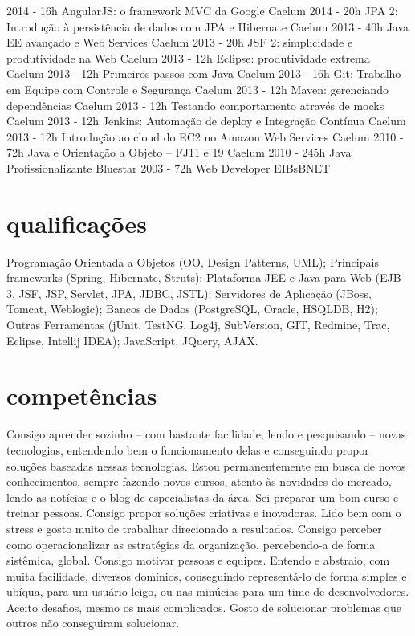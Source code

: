 \begin{entrylistii}
  \entryii
    {2014 - 16h}
    {AngularJS: o framework MVC da Google}
    {Caelum}
  \entryii
    {2014 - 20h}
    {JPA 2: Introdução à persistência de dados com JPA e Hibernate}
    {Caelum}
  \entryii
    {2013 - 40h}
    {Java EE avançado e Web Services}
    {Caelum}
  \entryii
    {2013 - 20h}
    {JSF 2: simplicidade e produtividade na Web}
    {Caelum}
  \entryii
    {2013 - 12h}
    {Eclipse: produtividade extrema}
    {Caelum}
  \entryii
    {2013 - 12h}
    {Primeiros passos com Java}
    {Caelum}
  \entryii
    {2013 - 16h}
    {Git: Trabalho em Equipe com Controle e Segurança}
    {Caelum}
  \entryii
    {2013 - 12h}
    {Maven: gerenciando dependências}
    {Caelum}
  \entryii
    {2013 - 12h}
    {Testando comportamento através de mocks}
    {Caelum}
  \entryii
    {2013 - 12h}
    {Jenkins: Automação de deploy e Integração Contínua}
    {Caelum}
  \entryii
    {2013 - 12h}
    {Introdução ao cloud do EC2 no Amazon Web Services}
    {Caelum}
  \entryii
    {2010 - 72h}
    {Java e Orientação a Objeto – FJ11 e 19}
    {Caelum}
  \entryii
    {2010 - 245h}
    {Java Profissionalizante}
    {Bluestar}
  \entryii
    {2003 - 72h}
    {Web Developer}
    {EIBsBNET}
\end{entrylistii}

\newpage

\section{qualificações}

Programação Orientada a Objetos (OO, Design Patterns, UML); Principais frameworks (Spring, Hibernate, Struts); Plataforma JEE e Java para Web (EJB 3, JSF, JSP, Servlet, JPA, JDBC, JSTL); Servidores de Aplicação (JBoss, Tomcat, Weblogic); Bancos de Dados (PostgreSQL, Oracle, HSQLDB, H2); Outras Ferramentas (jUnit, TestNG, Log4j, SubVersion, GIT, Redmine, Trac, Eclipse, Intellij IDEA); JavaScript, JQuery, AJAX.

\section{competências}

Consigo aprender sozinho – com bastante facilidade, lendo e pesquisando – novas tecnologias, entendendo bem o funcionamento delas e conseguindo propor soluções baseadas nessas tecnologias. Estou permanentemente em busca de novos conhecimentos, sempre fazendo novos cursos, atento às novidades do mercado, lendo as notícias e o blog de especialistas da área.
Sei preparar um bom curso e treinar pessoas.
Consigo propor soluções criativas e inovadoras.
Lido bem com o stress e gosto muito de trabalhar direcionado a resultados.
Consigo perceber como operacionalizar as estratégias da organização, percebendo-a de forma sistêmica, global.
Consigo motivar pessoas e equipes.
Entendo e abstraio, com muita facilidade, diversos domínios, conseguindo representá-lo de forma simples e ubíqua, para um usuário leigo, ou nas minúcias para um time de desenvolvedores.
Aceito desafios, mesmo os mais complicados.
Gosto de solucionar problemas que outros não conseguiram solucionar.

